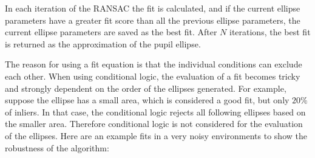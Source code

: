 In each iteration of the RANSAC the fit is calculated, and if the current ellipse parameters have a greater fit score than all the previous ellipse parameters, the current ellipse parameters are saved as the best fit. After $N$ iterations, the best fit is returned as the approximation of the pupil ellipse. 

The reason for using a fit equation is that the individual conditions can exclude each other. When using conditional logic, the evaluation of a fit becomes tricky and strongly dependent on the order of the ellipses generated. For example, suppose the ellipse has a small area, which is considered a good fit, but only $20\%$ of inliers. In that case, the conditional logic rejects all following ellipses based on the smaller area. Therefore conditional logic is not considered for the evaluation of the ellipses. 
Here are an example fits in a very noisy environments to show the robustness of the algorithm: 
